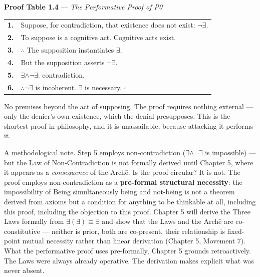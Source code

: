 \documentclass[10pt, openany, oneside]{book}
\begin{document}
\textbf{Proof Table 1.4} --- \textit{The Performative Proof of P0}

\vspace{0.5em}

\noindent\begin{tabular}{r p{}}
\textbf{1.} & Suppose, for contradiction, that existence does not exist: $\neg\exists$. \\[0.3em]
\textbf{2.} & To suppose is a cognitive act. Cognitive acts exist. \\[0.3em]
\textbf{3.} & $\therefore$ The supposition instantiates $\exists$. \\[0.3em]
\textbf{4.} & But the supposition asserts $\neg\exists$. \\[0.3em]
\textbf{5.} & $\exists \wedge \neg\exists$: contradiction. \\[0.3em]
\textbf{6.} & $\therefore \neg\exists$ is incoherent. $\exists$ is necessary. $\square$ \\[0.3em]
\end{tabular}

\vspace{0.8em}

\noindent No premises beyond the act of supposing. The proof requires nothing external --- only the denier's own existence, which the denial presupposes. This is the shortest proof in philosophy, and it is unassailable, because attacking it performs it.

A methodological note. Step 5 employs non-contradiction ($\exists \wedge \neg\exists$ is impossible) --- but the Law of Non-Contradiction is not formally derived until Chapter 5, where it appears as a \textit{consequence} of the Arch\={e}. Is the proof circular? It is not. The proof employs non-contradiction as a \textbf{pre-formal structural necessity}: the impossibility of Being simultaneously being and not-being is not a theorem derived from axioms but a condition for anything to be thinkable at all, including this proof, including the objection to this proof. Chapter 5 will derive the Three Laws formally from $\exists(\exists) \equiv \exists$ and show that the Laws and the Arch\={e} are co-constitutive --- neither is prior, both are co-present, their relationship is fixed-point mutual necessity rather than linear derivation (Chapter 5, Movement 7). What the performative proof uses pre-formally, Chapter 5 grounds retroactively. The Laws were always already operative. The derivation makes explicit what was never absent.
\end{document}
